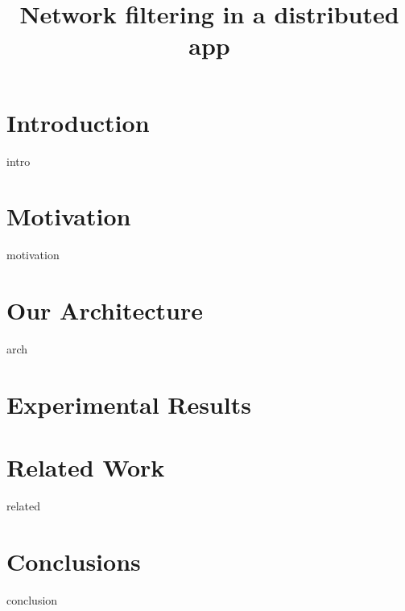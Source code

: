 \documentclass{sig-alternate}
\newcommand{\ignore}[1]{}
\begin{document}
\title{ Network filtering in a distributed app}


\date{}  %

\maketitle

\begin{abstract}
 
\end{abstract}

\section{Introduction}
\label{sec:intro}
 {intro}

\section{Motivation}
\label{sec:motivation}
 {motivation}

\ignore{Sometimes background is merged into motivation, and is not required separately.}

\section{Our Architecture}
\label{sec:arch}
 {arch}

\section{Experimental Results}
\label{sec:results}


\section{Related Work}
\label{sec:related}
 {related}

\section{Conclusions}
\label{sec:conclusion}
 {conclusion}


{ 


}
\end{document}
